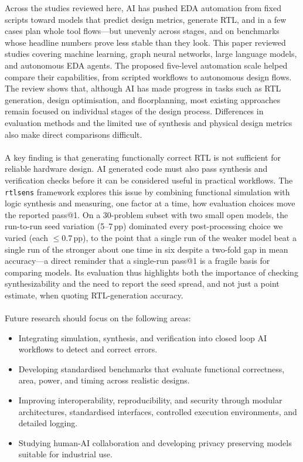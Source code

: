 \documentclass[conference]{IEEEtran}
\begin{document}
Across the studies reviewed here, AI has pushed EDA automation from fixed scripts toward models that predict design metrics, generate RTL, and in a few cases plan whole tool flows---but unevenly across stages, and on benchmarks whose headline numbers prove less stable than they look. This paper reviewed studies covering machine learning, graph neural networks, large language models, and autonomous EDA agents. The proposed five-level automation scale helped compare their capabilities, from scripted workflows to autonomous design flows. The review shows that, although AI has made progress in tasks such as RTL generation, design optimisation, and floorplanning, most existing approaches remain focused on individual stages of the design process. Differences in evaluation methods and the limited use of synthesis and physical design metrics also make direct comparisons difficult.
\\\\
\noindent A key finding is that generating functionally correct RTL is not sufficient for reliable hardware design. AI generated code must also pass synthesis and verification checks before it can be considered useful in practical workflows. The \texttt{rtlsens} framework explores this issue by combining functional simulation with logic synthesis and measuring, one factor at a time, how evaluation choices move the reported pass@1. On a 30-problem subset with two small open models, the run-to-run seed variation (5--7\,pp) dominated every post-processing choice we varied (each $\leq 0.7$\,pp), to the point that a single run of the weaker model beat a single run of the stronger about one time in six despite a two-fold gap in mean accuracy---a direct reminder that a single-run pass@1 is a fragile basis for comparing models. Its evaluation thus highlights both the importance of checking synthesizability and the need to report the seed spread, and not just a point estimate, when quoting RTL-generation accuracy.
\\\\
\noindent Future research should focus on the following areas:
\begin{itemize}
    \item Integrating simulation, synthesis, and verification into closed loop AI workflows to detect and correct errors.
    \item Developing standardised benchmarks that evaluate functional correctness, area, power, and timing across realistic designs.
    \item Improving interoperability, reproducibility, and security through modular architectures, standardised interfaces, controlled execution environments, and detailed logging.
    \item Studying human-AI collaboration and developing privacy preserving models suitable for industrial use.\\
\end{itemize}
\end{document}
